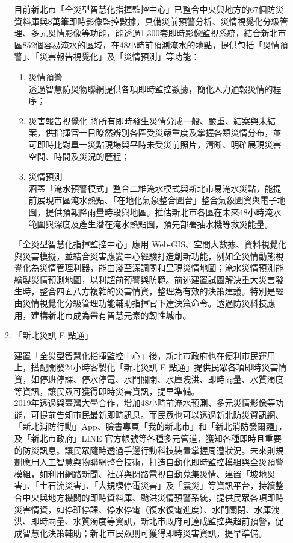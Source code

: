 \documentclass[a4paper,12pt]{article}
\begin{document}
\begin{enumerate}
\begin{enumerate}
目前新北市「全災型智慧化指揮監控中心」已整合中央與地方的67個防災資料庫與8萬筆即時影像監控數據，具備災前預警分析、災情視覺化分級管理、多元災情影像等功能，能透過1,300套即時影像監視系統，結合新北市區852個容易淹水的區域，在48小時前預測淹水的地點，提供包括「災情預警」、「災害報告視覺化」及「災情預測」等功能：\\
\begin{enumerate}
\item 災情預警\\
透過智慧防災物聯網提供各項即時監控數據，簡化人力通報災情的程序；\\
\item 災害報告視覺化 將所有即時發生災情分成一般、嚴重、結案與未結案，供指揮官一目瞭然辨別各區受災嚴重度及掌握各類災情分布，並可即時比對單一災點現場與平時未受災前照片，清晰、明確展現災害空間、時間及災況的歷程；\\
\item 災情預測\\
涵蓋「淹水預警模式」整合二維淹水模式與新北市易淹水災點，能提前展現市區淹水熱點、「在地化氣象整合圖台」整合氣象圖資與電子地圖，提供預報降雨量時段與地區。推估新北市各區在未來48小時淹水範圍與深度及產生潛在淹水熱點圖，預先部署抽水機等救災能量。\\
\end{enumerate}
「全災型智慧化指揮監控中心」應用 Web-GIS、空間大數據、資料視覺化與災害模擬，並結合災害應變中心經驗打造創新功能，例如全災情動態視覺化為災情管理利器，能由淺至深調閱和呈現災情地圖；淹水災情預測能繪製災情預測地圖，以利超前預警與防範。前述建置試圖解決重大災害發生時，整合四面八方複雜的災害情資，整理為有效的決策建議。特別是經由災情視覺化分級管理功能輔助指揮官下達決策命令。透過防災科技應用，建構新北市成為帶有智慧元素的韌性城市。\\
\item 「新北災訊 E 點通」
\label{sec:orgd3b2b36}

建置「全災型智慧化指揮監控中心」後，新北市政府也在便利市民運用上，搭配開發24小時客製化「新北災訊 E 點通」提供民眾各項即時災害情資，如停班停課、停水停電、水門關閉、水庫洩洪、即時雨量、水質濁度等資訊，讓民眾可獲得即時災害資訊，提早準備。\\

2019年透過與臺灣大學合作，增加48小時前淹水預測、多元災情影像等功能，可提前告知市民最新即時訊息。而民眾也可以透過新北防災資訊網、「新北消防行動」App、臉書專頁「我的新北市」和「新北消防發爾麵」，及「新北市政府」LINE 官方帳號等各種多元管道，獲知各種即時且重要的防災訊息。讓民眾隨時透過手邊行動科技裝置掌握周遭狀況。未來則規劃應用人工智慧與物聯網整合技術，打造自動化即時監控模組與全災預警模組，如利用網路新聞、社群與閉路電視自動蒐集災情、建置「坡地災害」、「土石流災害」、「大規模停電災害」及「震災」等資訊平台，持續整合中央與地方機關的即時資料庫、颱洪災情預警系統，提供民眾各項即時災害情資，如停班停課、停水停電（復水復電進度）、水門關閉、水庫洩洪、即時雨量、水質濁度等資訊，新北市政府可達成監控與超前預警，促成智慧化決策輔助；新北市民眾則可獲得即時災害資訊，提早準備。\\


\end{enumerate}
\end{enumerate}
\end{document}
